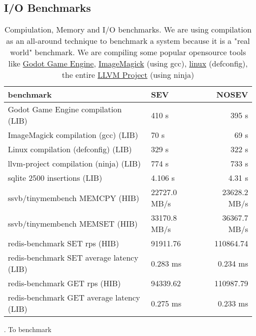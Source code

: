 \documentclass[twocolumn]{article}
\begin{document}
\subsection{I/O Benchmarks}

\begin{table*}
    \centering
    \label{tab:tinyben-results}
    \begin{tabular}{l|l|r}
        \textbf{benchmark} &       \textbf{SEV} &       \textbf{NOSEV} \\
    \hline
    Godot Game Engine compilation (LIB)       &  410 s         & 395 s   \\
    ImageMagick compilation (gcc) (LIB)       &  70 s          & 69 s \\
    Linux compilation (defconfig) (LIB)       &  329 s         & 322 s \\
    llvm-project compilation (ninja) (LIB)    &  774 s         & 733 s  \\
    sqlite 2500 insertions (LIB)              &  4.106 s       & 4.31 s \\
    ssvb/tinymembench MEMCPY (HIB)            &  22727.0 MB/s  & 23628.2 MB/s \\
    ssvb/tinymembench MEMSET (HIB)            &  33170.8 MB/s  & 36367.7 MB/s \\
    redis-benchmark SET rps (HIB)             &  91911.76      & 110864.74 \\
    redis-benchmark SET average latency (LIB) &  0.283 ms      & 0.234 ms \\
    redis-benchmark GET rps (HIB)             &  94339.62      & 110987.79 \\
    redis-benchmark GET average latency (LIB) &  0.275 ms	   & 0.233 ms \\
    \end{tabular}
    \caption{Compiulation, Memory and I/O benchmarks. We are using compilation as an all-around technique to benchmark a system because it is a "real world" benchmark. We are compiling some popular opensource tools like \href{https://github.com/godotengine/godot}{Godot Game Engine}, \href{https://github.com/imagemagick/imagemagick}{ImageMagick} (using gcc), \href{https://git.kernel.org/pub/scm/linux/kernel/git/torvalds/linux.git}{linux} (defconfig), the entire \href{https://github.com/llvm/llvm-project}{LLVM Project} (using ninja)}. To benchmark 
\end{table*}
\end{document}
